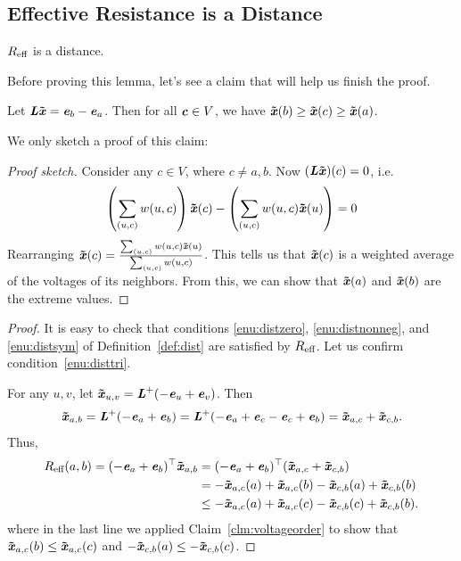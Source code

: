 \subsection{Effective Resistance is a Distance}
\begin{lemma}
  $\er$ is a distance.
\end{lemma}
Before proving this lemma, let's see a claim that will help us finish
the proof.
\begin{claim}
    \label{clm:voltageorder}
    Let $\LL \xxtil = \ee_b - \ee_a$.
    Then for all $\cc \in V$, we have $\xxtil(b) \geq \xxtil(c) \geq \xxtil(a)$.
  \end{claim}
  We only sketch a proof of this claim:
  \begin{proof}[Proof sketch]
    Consider any $c \in V$, where $c\neq a,b$.
    Now $(\LL \xxtil)(c) = 0$, i.e.
    \[
      \left( \sum_{(u,c)} w(u,c) \right) \xxtil(c) - \left(
        \sum_{(u,c)} w(u,c) \xxtil(u) \right) = 0
    \]
    Rearranging $ \xxtil(c) = \frac{\sum_{(u,c)} w(u,c) \xxtil(u)
    }{\sum_{(u,c)} w(u,c)}$.
   This tells us that $\xxtil(c)$ is a weighted average of the
   voltages of its neighbors. From this, we can show that $\xxtil(a)$
   and $\xxtil(b)$ are the extreme values.
  \end{proof}
\begin{proof}
  It is easy to check that conditions
  \ref{enu:distzero}, \ref{enu:distnonneg}, and \ref{enu:distsym} of Definition~\ref{def:dist} are satisfied by
  $\er$.
  Let us confirm condition~\ref{enu:disttri}.

  For any $u,v$, let $\xxtil_{u,v} = \LL^\pinv ( -\ee_u + \ee_v )$.
  Then
  \[
    \xxtil_{a,b} = \LL^\pinv ( -\ee_a+ \ee_b)
  =  \LL^\pinv ( -\ee_a + \ee_c - \ee_c  + \ee_b)
  = \xxtil_{a,c} + \xxtil_{c,b}
  .
\]
Thus,
\begin{align*}
  \er(a,b) =  ( -\ee_a+ \ee_b)^\trp \xxtil_{a,b}
  &=  ( -\ee_a+ \ee_b)^\trp(\xxtil_{a,c} + \xxtil_{c,b})
  \\
  &= -\xxtil_{a,c}(a) + \xxtil_{a,c}(b) -\xxtil_{c,b}(a) +
  \xxtil_{c,b}(b)
  \\
   &\leq -\xxtil_{a,c}(a) + \xxtil_{a,c}(c) -\xxtil_{c,b}(c) +
     \xxtil_{c,b}(b).
\end{align*}
where in the last line we applied Claim~\ref{clm:voltageorder} to show
that $\xxtil_{a,c}(b) \leq \xxtil_{a,c}(c)$ and ${ -\xxtil_{c,b}(a) \leq  -\xxtil_{c,b}(c)}$.
\end{proof}



